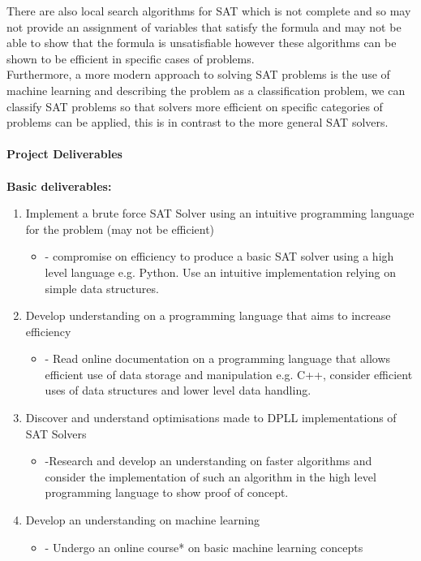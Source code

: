 \documentclass[12pt,a4paper]{article}
\begin{document}
There are also local search algorithms for SAT which is not complete and so may not provide an assignment of variables that satisfy the formula and may not be able to show that the formula is unsatisfiable however these algorithms can be shown to be efficient in specific cases of problems.\\
Furthermore, a more modern approach to solving SAT problems is the use of machine learning and describing the problem as a classification problem, we can classify SAT problems so that solvers more efficient on specific categories of problems can be applied, this is in contrast to the more general SAT solvers.\\\\
{\bf Project Deliverables}\\\\
{\bf Basic deliverables:}
\begin{enumerate}
		\item Implement a brute force SAT Solver using an intuitive programming language for the problem (may not be efficient)
			\begin{itemize}
				\item{- compromise on efficiency to produce a basic SAT solver using a high level language e.g. Python. Use an intuitive implementation relying on simple data structures.}
			\end{itemize}
		\item Develop understanding on a programming language that aims to increase efficiency
			\begin{itemize}
				\item{ - Read online documentation on a programming language that allows efficient use of data storage and manipulation e.g. C++, consider efficient uses of data structures and lower level data handling.}
			\end{itemize}
		\item Discover and understand optimisations made to DPLL implementations of SAT Solvers
			\begin{itemize}
				\item{-Research and develop an understanding on faster algorithms and consider the implementation of such an algorithm in the high level programming language to show proof of concept.}
			\end{itemize}
		\item Develop an understanding on machine learning
			\begin{itemize}
				\item{- Undergo an online course* on basic machine learning concepts}
			\end{itemize}	
	\end{enumerate}
\end{document}
